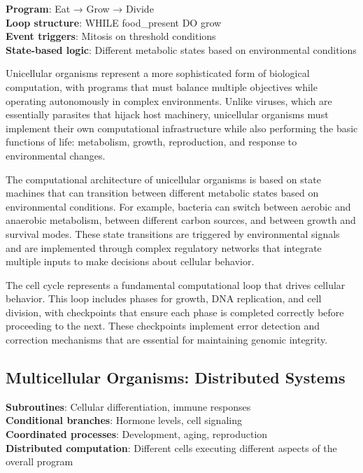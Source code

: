 \documentclass[11pt]{article}
\begin{document}
\textbf{Program}: Eat → Grow → Divide\\
\textbf{Loop structure}: WHILE food\_present DO grow\\
\textbf{Event triggers}: Mitosis on threshold conditions\\
\textbf{State-based logic}: Different metabolic states based on environmental conditions

Unicellular organisms represent a more sophisticated form of biological computation, with programs that must balance multiple objectives while operating autonomously in complex environments. Unlike viruses, which are essentially parasites that hijack host machinery, unicellular organisms must implement their own computational infrastructure while also performing the basic functions of life: metabolism, growth, reproduction, and response to environmental changes.

The computational architecture of unicellular organisms is based on state machines that can transition between different metabolic states based on environmental conditions. For example, bacteria can switch between aerobic and anaerobic metabolism, between different carbon sources, and between growth and survival modes. These state transitions are triggered by environmental signals and are implemented through complex regulatory networks that integrate multiple inputs to make decisions about cellular behavior.

The cell cycle represents a fundamental computational loop that drives cellular behavior. This loop includes phases for growth, DNA replication, and cell division, with checkpoints that ensure each phase is completed correctly before proceeding to the next. These checkpoints implement error detection and correction mechanisms that are essential for maintaining genomic integrity.

\subsection{Multicellular Organisms: Distributed Systems}

\textbf{Subroutines}: Cellular differentiation, immune responses\\
\textbf{Conditional branches}: Hormone levels, cell signaling\\
\textbf{Coordinated processes}: Development, aging, reproduction\\
\textbf{Distributed computation}: Different cells executing different aspects of the overall program
\end{document}
